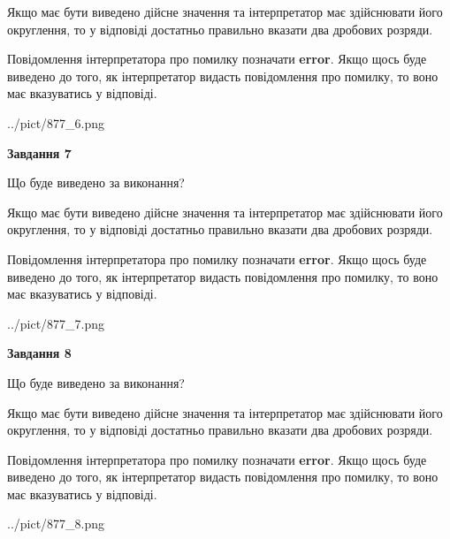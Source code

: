 \documentclass[12pt, ukrainian]{article}
\begin{document}
{\begin {Large}
Якщо має бути виведено дійсне значення та інтерпретатор має здійснювати його округлення, 
то у відповіді достатньо правильно вказати два дробових розряди.

Повідомлення інтерпретатора про помилку позначати \textbf{error}.
Якщо щось буде виведено до того, як інтерпретатор видасть повідомлення про помилку, 
то воно має вказуватись у відповіді. \par

\begin{center}
	{../pict/877_6.png}
\end{center}
\newpage

{\begin {center}\textbf{Завдання 7}\end {center}}\par
Що буде виведено за виконання? \par

Якщо має бути виведено дійсне значення та інтерпретатор має здійснювати його округлення, 
то у відповіді достатньо правильно вказати два дробових розряди.

Повідомлення інтерпретатора про помилку позначати \textbf{error}.
Якщо щось буде виведено до того, як інтерпретатор видасть повідомлення про помилку, 
то воно має вказуватись у відповіді. \par

\begin{center}
	{../pict/877_7.png}
\end{center}
\newpage

{\begin {center}\textbf{Завдання 8}\end {center}}\par
Що буде виведено за виконання? \par

Якщо має бути виведено дійсне значення та інтерпретатор має здійснювати його округлення, 
то у відповіді достатньо правильно вказати два дробових розряди.

Повідомлення інтерпретатора про помилку позначати \textbf{error}.
Якщо щось буде виведено до того, як інтерпретатор видасть повідомлення про помилку, 
то воно має вказуватись у відповіді. \par

\begin{center}
	{../pict/877_8.png}
\end{center}
\newpage


\end{Large}}
\end{document}
